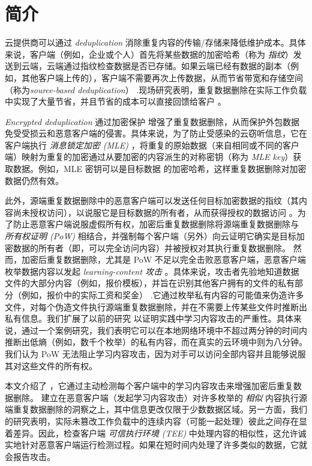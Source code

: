 \section{简介}
\label{sec:featurespy-intro}

云提供商可以通过 {\em deduplication} \cite{harnik10} 消除重复内容的传输/存储来降低维护成本。具体来说，客户端（例如，企业或个人）首先将某些数据的加密哈希（称为 {\em 指纹}）发送到云端，云端通过指纹检查数据是否已存储。如果云端已经有数据的副本（例如，其他客户端上传的），客户端不需要再次上传数据，从而节省带宽和存储空间（称为{\em source-based deduplication}） .现场研究表明，重复数据删除在实际工作负载 \cite{jin09, meyer11, wallace12} 中实现了大量节省，并且节省的成本可以直接回馈给客户 \cite{bellare13b, armknecht15}。


{\em Encrypted deduplication} 通过加密保护 \cite{bellare2013MLE, halevi11} 增强了重复数据删除，从而保护外包数据免受受损云和恶意客户端的侵害。具体来说，为了防止受感染的云窃听信息，它在客户端执行 {\em 消息锁定加密 (MLE)} \cite{bellare2013MLE}，将重复的原始数据（来自相同或不同的客户端）映射为重复的加密通过从要加密的内容派生的对称密钥（称为 {\em MLE key}）获取数据。例如，MLE 密钥可以是目标数据 \cite{douceur02} 的加密哈希，这样重复数据删除对加密数据仍然有效。

此外，源端重复数据删除中的恶意客户端可以发送任何目标加密数据的指纹（其内容尚未授权访问），以说服它是目标数据的所有者，从而获得授权的数据访问 \cite{ halevi11,mulazzani11}。为了防止恶意客户端说服虚假所有权，加密后重复数据删除将源端重复数据删除与 {\em 所有权证明 (PoW)} \cite{halevi11} 相结合，并强制每个客户端（另外）向云证明它确实是目标加密数据的所有者（即，可以完全访问内容）并被授权对其执行重复数据删除。
然而，加密后重复数据删除，尤其是 PoW 不足以完全击败恶意客户端，恶意客户端枚举数据内容以发起 {\em learning-content 攻击} \cite{harnik10, zuo2018mitigating}。具体来说，攻击者先验地知道数据文件的大部分内容（例如，报价模板），并旨在识别其他客户拥有的文件的私有部分（例如，报价中的实际工资和奖金） .它通过枚举私有内容的可能值来伪造许多文件，对每个伪造文件执行源端重复数据删除，并在不需要上传某些文件时推断出私有信息。我们扩展了以前的研究 \cite{harnik10, zuo2018mitigating} 以证明实践中学习内容攻击的严重性。具体来说，通过一个案例研究，我们表明它可以在本地网络环境中不超过两分钟的时间内推断出低熵（例如，数千个枚举）的私有内容，而在真实的云环境中则为八分钟。我们认为 PoW 无法阻止学习内容攻击，因为对手可以访问全部内容并且能够说服其对这些文件的所有权。


本文介绍了 \sysnameF，它通过主动检测每个客户端中的学习内容攻击来增强加密后重复数据删除。 \sysnameF 建立在恶意客户端（发起学习内容攻击）对许多枚举的 {\em 相似} 内容执行源端重复数据删除的洞察之上，其中信息更改仅限于少数数据区域。另一方面，我们的研究表明，实际未篡改工作负载中的连续内容（可能一起处理）彼此之间存在显着差异。因此，\sysnameF 检查客户端 {\em 可信执行环境 (TEE)} \cite{sgx} 中处理内容的相似性，这允许诚实地针对恶意客户端运行检测过程。如果在短时间内处理了许多类似的数据，它就会报告攻击。



